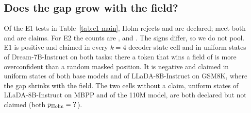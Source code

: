\begin{table}[t]
  \centering
  \caption{C1 primary endpoints. E1 $=\Delta(\VivaPoolMax)-\Delta(1)$ and E2 $=$
    field$(\VivaPoolMax)-$field$(1)$, with 95\% intervals (\VivaNBoot{} document resamples, calibrators held fixed for E2, \S\ref{sec:inference}; $\beta_z$: 1,000).
    Own, Third: the same contrast of own miscalibration and of $\E_m[\hat\pi(\ell,s)-a]$ (\S\ref{sec:estimands}); Own${}+{}$E2${}+{}$Third${}={}$E1 up to rounding. $^\dagger$declared; $^*$claimed (E2: given the fitted calibrators). $\beta_z$,
    $\beta_z^{\mathrm{FE}}$: Eq.~\ref{eq:eqtwo} without and with state fixed effects
    ($^\ddagger$interval excludes 0).}
  \label{tab:c1-main}
\end{table}

\subsection{Does the gap grow with the field?}
\label{sec:c1-main}

Of the
 E1 tests in Table~\ref{tab:c1-main}, Holm rejects  and
 are declared;  meet both and are claims.
For E2 the counts are ,  and
.
The signs differ, so we do not pool. E1 is positive and claimed in every $k{=}4$ decoder-state
cell and in uniform states of Dream-7B-Instruct on both tasks: there a token that wins a field of
\VivaPoolMax{} is more overconfident than a random masked position. It is negative and claimed
in uniform states of both base models and of LLaDA-8B-Instruct on GSM8K, where the gap
shrinks with the field. The two cells without a claim, uniform states of LLaDA-8B-Instruct on
MBPP and of the 110M model, are both declared but not claimed
(both $p_{\mathrm{Holm}}=\Cres{COneHolmPEOneLladaInstructMbppUni}$).

